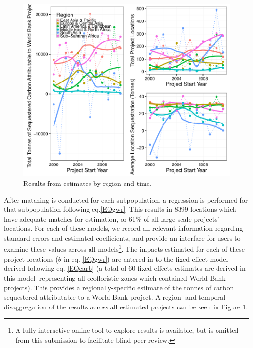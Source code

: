 \documentclass{article}\usepackage[]{graphicx}\usepackage[]{color}
\makeatletter
\def\maxwidth{ %
  \ifdim\Gin@nat@width>\linewidth
    \linewidth
  \else
    \Gin@nat@width
  \fi
}
\newenvironment{knitrout}{}{}  %
\makeatother
\begin{document}
\begin{knitrout}
\begin{figure}\centering
\begin{Schunk}

\includegraphics[width=\maxwidth]{figure/Fig1-1} \end{Schunk}
\caption{Results from estimates by region and time.}
\label{result_fig}
\vspace{10pt}
\end{figure}  

After matching is conducted for each subpopulation, a regression is performed for that subpopulation following eq.\ref{EQgwr}.  
This results in 8399 locations which have adequate matches for estimation, or 61\% of all large scale projects' locations. 
For each of these models, we record all relevant information regarding standard errors and estimated coefficients, and provide an interface for users to examine these values across all models\footnote{A fully interactive online tool to explore results is available, but is omitted from this submission to facilitate blind peer review.}.  
The impacts estimated for each of these project locations (\begin{math}\theta\end{math} in eq. \ref{EQgwr}) are entered in to the fixed-effect model derived following eq. \ref{EQcarb} (a total of 60 fixed effects estimates are derived in this model, representing all ecofloristic zones which contained World Bank projects).
This provides a regionally-specific estimate of the tonnes of carbon sequestered attributable to a World Bank project.
A region- and temporal- disaggregation of the results across all estimated projects can be seen in Figure \ref{result_fig}.


\end{knitrout}
\end{document}
